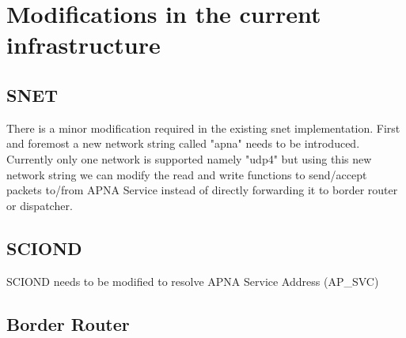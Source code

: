 \section{Modifications in the current infrastructure}
\subsection{SNET}
There is a minor modification required in the existing snet implementation. First and foremost a new network string called "apna" needs to be introduced. Currently only one network is supported namely "udp4" but using this new network string we can modify the read and write functions to send/accept packets to/from APNA Service instead of directly forwarding it to border router or dispatcher.
\subsection{SCIOND}
SCIOND needs to be modified to resolve APNA Service Address (AP\_SVC)
\subsection{Border Router}